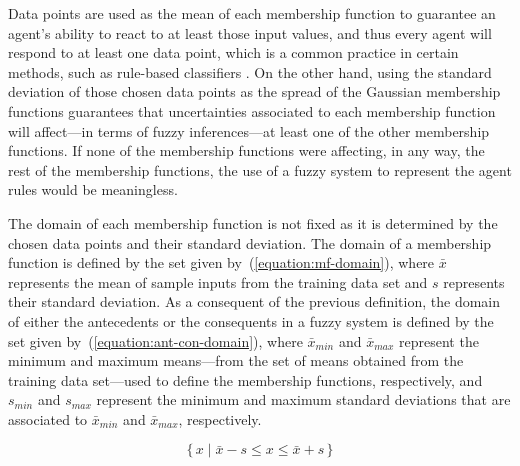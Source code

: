 \documentclass{ieeeaccess}
\begin{document}
Data points are used as the mean of each membership function to guarantee an agent's ability to react to at least those input
values, and thus every agent will respond to at least one data point, which is a common practice in certain methods, such as rule-based classifiers \cite{zhao2009building} \cite{almutairi2018rule}. On the other hand, using the standard deviation of those chosen data points as the spread of the Gaussian membership functions guarantees that uncertainties associated to each membership function will affect---in terms of fuzzy inferences---at least one of the other membership functions. If none of the membership functions were affecting, in any way, the rest of the membership functions, the use of a fuzzy system to represent the agent rules would be meaningless. 


The domain of each membership function is not fixed as it is determined by the chosen data points and their standard deviation. The domain of a membership function is defined by the set given by~(\ref{equation:mf-domain}), where $\bar{x}$ represents the mean of sample inputs from the training data set and $s$ represents their standard deviation. As a consequent of the previous definition, the domain of either the antecedents or the consequents in a fuzzy system is defined by the set given by~(\ref{equation:ant-con-domain}), where $\bar{x}_{min}$ and $\bar{x}_{max}$ represent the minimum and maximum means---from the set of means obtained from the training data set---used to define the membership functions, respectively, and $s_{min}$ and $s_{max}$ represent the minimum and maximum standard deviations that are associated to $\bar{x}_{min}$ and $\bar{x}_{max}$, respectively. %


\begin{equation}
  \label{equation:mf-domain}
  \{\,x \mid \bar{x} - s \leq x \leq \bar{x} + s \,\}
\end{equation}
\end{document}
